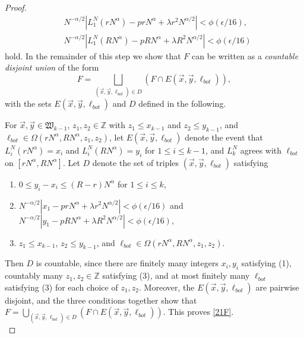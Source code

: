 \begin{proof}
\begin{equation}
\begin{split}
		& N^{-\alpha/2}\left|L_1^N(rN^\alpha) - prN^\alpha + \lambda r^2N^{\alpha/2}\right| < \phi(\epsilon/16),\\
		& N^{-\alpha/2}\left|L_1^N(RN^\alpha) - pRN^\alpha + \lambda R^2N^{\alpha/2}\right| < \phi(\epsilon/16)
		\end{split}
		\end{equation}
		hold. In the remainder of this step we show that $F$ can be written as a \textit{countable disjoint union} of the form
		\begin{equation}\label{21F}
		F = \bigsqcup_{(\vec{x},\vec{y},\ell_{bot})\in D} \left( F \cap E(\vec{x},\vec{y},\ell_{bot})\right),
		\end{equation} 
		with the sets $E(\vec{x},\vec{y},\ell_{bot})$ and $D$
		defined in the following.
		
		For $\vec{x},\vec{y}\in\mathfrak{W}_{k-1}$, $z_1,z_2\in\mathbb{Z}$ with $z_1\leq x_{k-1}$ and $z_2\leq y_{k-1}$, and $\ell_{bot}\in\Omega(rN^\alpha,RN^\alpha,z_1,z_2)$, let $E(\vec{x},\vec{y},\ell_{bot})$ denote the event that $L_i^N(rN^\alpha) = x_i$ and $L_i^N(RN^\alpha)=y_i$ for $1\leq i\leq k-1$, and $L_k^N$ agrees with $\ell_{bot}$ on $[rN^\alpha,RN^\alpha]$. Let $D$ denote the set of triples $(\vec{x},\vec{y},\ell_{bot})$ satisfying
		\begin{enumerate}[label=(\arabic*)]
			
			\item $0\leq y_i - x_i \leq (R-r)N^\alpha$ for $1\leq i\leq k$,
			
			\item $N^{-\alpha/2}|x_1 - prN^\alpha + \lambda r^2N^{\alpha/2}| < \phi(\epsilon/16)$ and $N^{-\alpha/2}|y_1-pRN^\alpha + \lambda R^2N^{\alpha/2}| < \phi(\epsilon/16)$,
			
			\item $z_1\leq x_{k-1}$, $z_2\leq y_{k-1}$, and $\ell_{bot} \in \Omega(rN^\alpha,RN^\alpha,z_1,z_2)$.
			
		\end{enumerate}
		Then $D$ is countable, since there are finitely many integers $x_i,y_i$ satisfying (1), countably many $z_1,z_2\in\mathbb{Z}$ satisfying (3), and at most finitely many $\ell_{bot}$ satisfying (3) for each choice of $z_1,z_2$. Moreover, the $E(\vec{x},\vec{y},\ell_{bot})$ are pairwise disjoint, and the three conditions together show that $F = \bigcup_{(\vec{x},\vec{y},\ell_{bot})\in D} (F\cap E(\vec{x},\vec{y},\ell_{bot}))$. This proves \eqref{21F}.\\
		

\end{proof}
